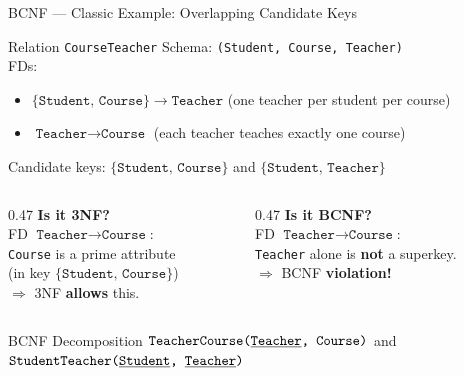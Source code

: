 \begin{frame}{BCNF --- Classic Example: Overlapping Candidate Keys}
  \begin{block}{Relation \texttt{CourseTeacher}}
    Schema: \texttt{(Student, Course, Teacher)}\\[4pt]
    FDs:
    \begin{itemize}
      \item $\{\texttt{Student, Course}\} \to \texttt{Teacher}$ \quad (one teacher per student per course)
      \item $\texttt{Teacher} \to \texttt{Course}$ \quad (each teacher teaches exactly one course)
    \end{itemize}
    Candidate keys: $\{\texttt{Student, Course}\}$ and $\{\texttt{Student, Teacher}\}$
  \end{block}

  \begin{columns}[t]
    \begin{column}{0.47\textwidth}
      \textbf{Is it 3NF?}\\[2pt]
      FD $\texttt{Teacher} \to \texttt{Course}$:\\
      \texttt{Course} is a prime attribute\\
      (in key $\{\texttt{Student, Course}\}$)\\
      $\Rightarrow$ 3NF \textbf{allows} this.
    \end{column}
    \begin{column}{0.47\textwidth}
      \textbf{Is it BCNF?}\\[2pt]
      FD $\texttt{Teacher} \to \texttt{Course}$:\\
      \texttt{Teacher} alone is \textbf{not} a superkey.\\
      $\Rightarrow$ BCNF \textbf{violation!}
    \end{column}
  \end{columns}

  \vspace{0.4em}
  \begin{block}{BCNF Decomposition}
    $\texttt{TeacherCourse(\underline{Teacher}, Course)}$ \quad and \quad
    $\texttt{StudentTeacher(\underline{Student}, \underline{Teacher})}$
  \end{block}
\end{frame}

